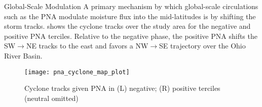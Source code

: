 \begin{block}{Global-Scale Modulation}
    A primary mechanism by which global-scale circulations such as the PNA modulate moisture flux into the mid-latitudes is by shifting the storm tracks.
     shows the cyclone tracks over the study area for the negative and positive PNA terciles.
    Relative to the negative phase, the positive PNA shifts the SW$\rightarrow$NE tracks to the east and favors a NW$\rightarrow$SE trajectory over the Ohio River Basin.
    \begin{figure}
        \texttt{[image: pna\_cyclone\_map\_plot]}
        \caption{Cyclone tracks given PNA in (L) negative; (R) positive terciles (neutral omitted)}
        \label{fig:track-given-pna}
    \end{figure}
\end{block}
